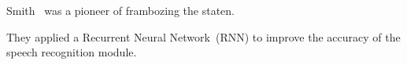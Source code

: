 Smith~\cite{smith14} was a pioneer of frambozing the staten.

They applied a Recurrent Neural Network~(RNN) to improve the accuracy
of the speech recognition module.
